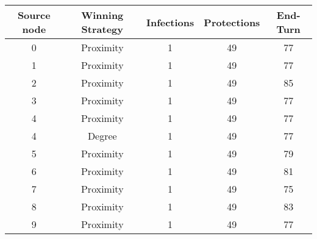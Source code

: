 \documentclass[results.tex]{subfiles}
\begin{document}
    \begin{center}
        \begin{tabular}{| c || c | c | c | c |}
            \hline
            {\bfseries Source node} & {\bfseries Winning Strategy} & {\bfseries Infections} & {\bfseries Protections}
            & {\bfseries End-Turn}
            \\  %
            \hline\hline
            0                       & Proximity                    & 1                      & 49                      & 77                   \\
            \hline
            1                       & Proximity                    & 1                      & 49                      & 77                   \\
            \hline
            2                       & Proximity                    & 1                      & 49                      & 85                   \\
            \hline
            3                       & Proximity                    & 1                      & 49                      & 77                   \\
            \hline
            4                       & Proximity                    & 1                      & 49                      & 77                   \\
            \hline
            4                       & Degree                       & 1                      & 49                      & 77                   \\
            \hline
            5                       & Proximity                    & 1                      & 49                      & 79                   \\
            \hline
            6                       & Proximity                    & 1                      & 49                      & 81                   \\
            \hline
            7                       & Proximity                    & 1                      & 49                      & 75                   \\
            \hline
            8                       & Proximity                    & 1                      & 49                      & 83                   \\
            \hline
            9                       & Proximity                    & 1                      & 49                      & 77                   \\

\end{tabular}
\end{center}
\end{document}
